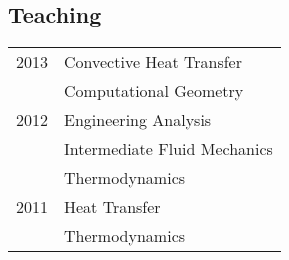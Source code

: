 \subsection*{Teaching}

\begin{longtable}{p{} p{}}
2013 & Convective Heat Transfer \\
     & Computational Geometry \\
2012 & Engineering Analysis \\
     & Intermediate Fluid Mechanics \\
	 & Thermodynamics \\
2011 & Heat Transfer \\
     & Thermodynamics \\
\end{longtable}
